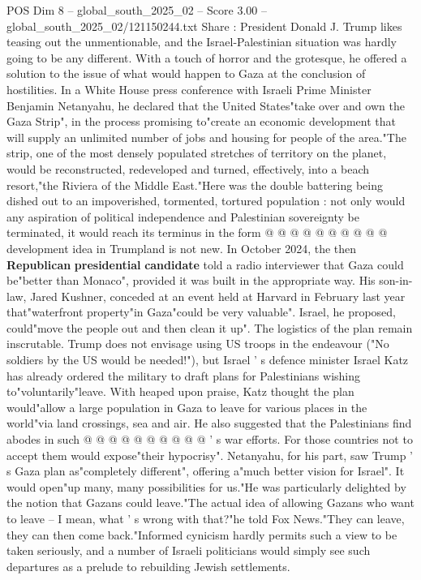 \begin{textsample}{POS Dim 8 – global\_south\_2025\_02 – Score 3.00 – global\_south\_2025\_02/121150244.txt}  \label{ex:f8_pos_395}
Share : President Donald J.
Trump likes teasing out the unmentionable, and the Israel-Palestinian situation was hardly going to be any different.
With a touch of horror and the grotesque, he offered a solution to the issue of what would happen to Gaza at the conclusion of hostilities.
In a White House press conference with Israeli Prime Minister Benjamin Netanyahu, he declared that the United States"take over and own the Gaza Strip", in the process promising to"create an economic development that will supply an unlimited number of jobs and housing for people of the area."The strip, one of the most densely populated stretches of territory on the planet, would be reconstructed, redeveloped and turned, effectively, into a beach resort,"the Riviera of the Middle East."Here was the double battering being dished out to an impoverished, tormented, tortured population : not only would any aspiration of political independence and Palestinian sovereignty be terminated, it would reach its terminus in the form @ @ @ @ @ @ @ @ @ @ development idea in Trumpland is not new.
In October 2024, the then \textbf{Republican} \textbf{presidential} \textbf{candidate} told a radio interviewer that Gaza could be"better than Monaco", provided it was built in the appropriate way.
His son-in-law, Jared Kushner, conceded at an event held at Harvard in February last year that"waterfront property"in Gaza"could be very valuable".
Israel, he proposed, could"move the people out and then clean it up".
The logistics of the plan remain inscrutable.
Trump does not envisage using US troops in the endeavour ("No soldiers by the US would be needed!"), but Israel ' s defence minister Israel Katz has already ordered the military to draft plans for Palestinians wishing to"voluntarily"leave.
With heaped upon praise, Katz thought the plan would"allow a large population in Gaza to leave for various places in the world"via land crossings, sea and air.
He also suggested that the Palestinians find abodes in such @ @ @ @ @ @ @ @ @ @ ' s war efforts.
For those countries not to accept them would expose"their hypocrisy".
Netanyahu, for his part, saw Trump ' s Gaza plan as"completely different", offering a"much better vision for Israel".
It would open"up many, many possibilities for us."He was particularly delighted by the notion that Gazans could leave."The actual idea of allowing Gazans who want to leave -- I mean, what ' s wrong with that?"he told Fox News."They can leave, they can then come back."Informed cynicism hardly permits such a view to be taken seriously, and a number of Israeli politicians would simply see such departures as a prelude to rebuilding Jewish settlements.

\end{textsample}
